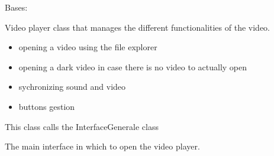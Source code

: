 \documentclass[letterpaper,10pt,english]{sphinxmanual}
\begin{document}

\begin{fulllineitems}
\label{\detokenize{general_interface:general_interface_V10.LecteurVideo}}
\pysigstartsignatures
{}
\pysigstopsignatures
\sphinxAtStartPar
Bases: 

\sphinxAtStartPar
Video player class that manages the different functionalities of the video.
\begin{description}
\begin{itemize}
\item {} 
\sphinxAtStartPar
opening a video using the file explorer

\item {} 
\sphinxAtStartPar
opening a dark video \sphinxhyphen{} in case there is no video to actually open

\item {} 
\sphinxAtStartPar
sychronizing sound and video

\item {} 
\sphinxAtStartPar
buttons gestion

\end{itemize}

\end{description}

\sphinxAtStartPar
This class calls the InterfaceGenerale class

\begin{fulllineitems}
\label{\detokenize{general_interface:general_interface_V10.LecteurVideo.interface_generale}}
\pysigstartsignatures
{}
\pysigstopsignatures
\sphinxAtStartPar
The main interface in which to open the video player.
\begin{quote}\begin{description}
\sphinxAtStartPar
{\hyperref[\detokenize{general_interface:general_interface_V10.InterfaceGenerale}]{}}


\end{description}
\end{quote}
\end{fulllineitems}
\end{fulllineitems}
\end{document}
